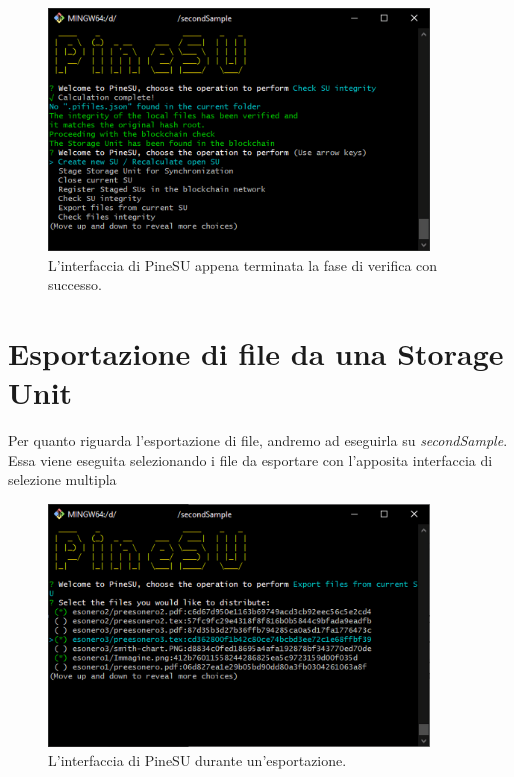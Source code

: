 \begin{figure}[H]
    \centering
    \includegraphics[width=0.9\textwidth]{Figures/verify}
    \caption{\small{
    L'interfaccia di PineSU appena terminata la fase di verifica con successo.
    } %
    } %
    \label{fi:ver}
\end{figure}
\newpage

\section{Esportazione di file da una Storage Unit}
\label{sub:exp}
Per quanto riguarda l'esportazione di file, andremo ad eseguirla su \emph{secondSample}.
Essa viene eseguita selezionando i file da esportare con l'apposita interfaccia
di selezione multipla
\begin{figure}[H]
    \centering
    \includegraphics[width=0.9\textwidth]{Figures/export}
    \caption{\small{
    L'interfaccia di PineSU durante un'esportazione.
    } %
    } %
    \label{fi:exp}
\end{figure}

